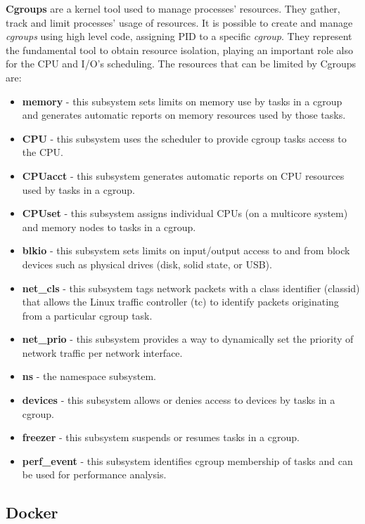 \documentclass[a4paper,12pt]{article}
\begin{document}
\textbf{Cgroups} are a kernel tool used to manage processes' resources. They
gather, track and limit processes' usage of resources. It is possible to create
and manage \textit{cgroups} using high level code, assigning PID to a specific
\textit{cgroup}. They represent the fundamental tool to obtain resource
isolation, playing an important role also for the CPU and I/O's scheduling. The
resources that can be limited by Cgroups
are\cite{red_hat_introduction_to_cgroups}:
\begin{itemize}
  \item \textbf{memory} - this subsystem sets limits on memory use by tasks in a
  cgroup and generates automatic reports on memory resources used by those
  tasks. 
  \item \textbf{CPU} - this subsystem uses the scheduler to provide cgroup tasks
  access to the CPU. 
  \item \textbf{CPUacct} - this subsystem generates automatic reports on CPU
  resources used by tasks in a cgroup. 
  \item \textbf{CPUset} - this subsystem assigns individual CPUs (on a multicore
  system) and memory nodes to tasks in a cgroup.
  \item \textbf{blkio} - this subsystem sets limits on input/output access to
  and from block devices such as physical drives (disk, solid state, or USB). 
  \item \textbf{net\_cls} - this subsystem tags network packets with a class
  identifier (classid) that allows the Linux traffic controller (tc) to identify
  packets originating from a particular cgroup task. 
  \item \textbf{net\_prio} - this subsystem provides a way to dynamically set
  the priority of network traffic per network interface. 
  \item \textbf{ns} - the namespace subsystem. 
  \item \textbf{devices} - this subsystem allows or denies access to devices by
  tasks in a cgroup. 
  \item \textbf{freezer} - this subsystem suspends or resumes tasks in a cgroup.
  \item \textbf{perf\_event} - this subsystem identifies cgroup membership of
  tasks and can be used for performance analysis. 
\end{itemize}   

\subsection{Docker}
\end{document}
